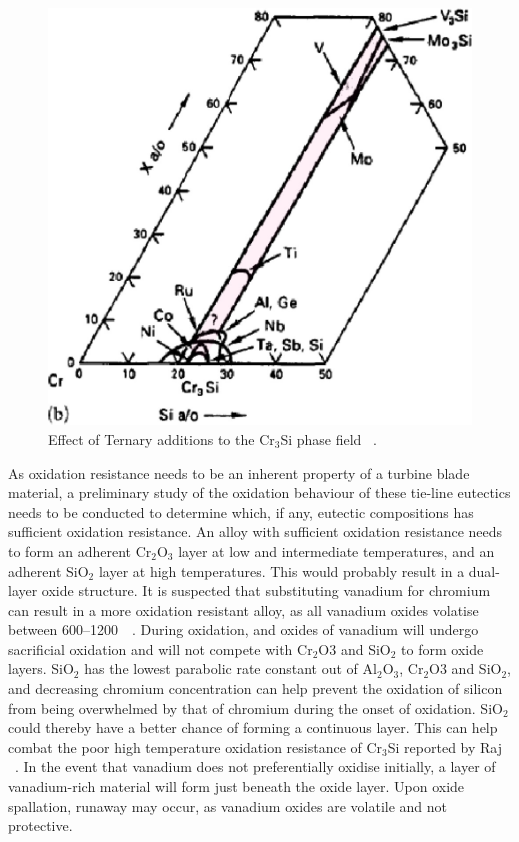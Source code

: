 %
\begin{figure}[H]
\begin{center}
\includegraphics{Cr3Si_alloying}
\caption{Effect of Ternary additions to the Cr$_3$Si phase field ~\cite{shah92}.}\label{fig:Cr3Si_alloying}
\end{center}
\end{figure}
\vspace{-5mm}
%
As oxidation resistance needs to be an inherent property of a turbine blade material, a preliminary study of the oxidation behaviour of these tie-line eutectics needs to be conducted to determine which, if any, eutectic compositions has sufficient oxidation resistance. An alloy with sufficient oxidation resistance needs to form an adherent Cr$_2$O$_3$ layer at low and intermediate temperatures, and an adherent SiO$_2$ layer at high temperatures. This would probably result in a dual-layer oxide structure. It is suspected that substituting vanadium for chromium can result in a more oxidation resistant alloy, as all vanadium oxides volatise between 600--1200\celsius\ ~\cite{wriedt90}. During oxidation, and oxides of vanadium will undergo sacrificial oxidation and will not compete with Cr$_2$O3 and SiO$_2$ to form oxide layers. SiO$_2$ has the lowest parabolic rate constant out of Al$_2$O$_3$, Cr$_2$O3 and SiO$_2$, and decreasing chromium concentration can help prevent the oxidation of silicon from being overwhelmed by that of chromium during the onset of oxidation. SiO$_2$ could thereby have a better chance of forming a continuous layer. This can help combat the poor high temperature oxidation resistance of Cr$_3$Si reported by Raj ~\cite{raj95}. In the event that vanadium does not preferentially oxidise initially, a layer of vanadium-rich material will form just beneath the oxide layer. Upon oxide spallation, runaway may occur, as vanadium oxides are volatile and not protective. 

